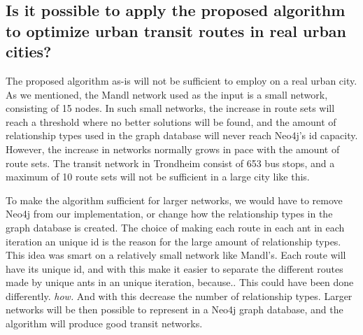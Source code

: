 

\subsection{ Is it possible to apply the proposed algorithm to optimize urban transit routes in real urban cities?}

    The proposed algorithm as-is will not be sufficient to employ on a real urban city. As we mentioned, the Mandl network used as the input is a small network, consisting of 15 nodes. In such small networks, the increase in route sets will reach a threshold where no better solutions will be found, and the amount of relationship types used in the graph database will never reach Neo4j's id capacity. However, the increase in networks normally grows in pace with the amount of route sets. The transit network in Trondheim consist of 653 bus stops\citep{website:rutebok}, and a maximum of 10 route sets will not be sufficient in a large city like this. %

    To make the algorithm sufficient for larger networks, we would have to remove Neo4j from our implementation, or change how the relationship types in the graph database is created. The choice of making each route in each ant in each iteration an unique id is the reason for the large amount of relationship types. This idea was smart on a relatively small network like Mandl's. Each route will have its unique id, and with this make it easier to separate the different routes made by unique ants in an unique iteration, because.. This could have been done differently. \emph{\color{blue} how.} And with this decrease the number of relationship types. Larger networks will be then possible to represent in a Neo4j graph database, and the algorithm will produce good transit networks.

